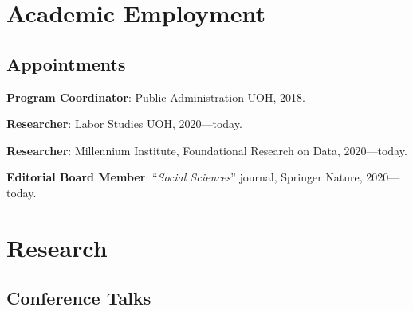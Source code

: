\documentclass[letterpaper]{article}
\renewenvironment{itemize}{
  \begin{list}{}{
    \setlength{\leftmargin}{1.5em}
  }
}{
  \end{list}
}
\begin{document}
\section*{Academic Employment}

{\unskip}

\subsection*{Appointments}

\begin{itemize}
  \item[\textcolor{gray}{\textbullet}] {\bf Program Coordinator}: Public Administration UOH, 2018.
  \item[\textcolor{gray}{\textbullet}] {\bf Researcher}: Labor Studies UOH, 2020---today.
  \item[\textcolor{gray}{\textbullet}] {\bf Researcher}: Millennium Institute, Foundational Research on Data, 2020---today.
  \item[\textcolor{gray}{\textbullet}] {\bf Editorial Board Member}: ``\emph{Social Sciences}'' journal, Springer Nature, 2020---today.
\end{itemize}

\section*{Research}
{\unskip}



{}



\subsection*{Conference Talks}

{\unskip}
\end{document}
